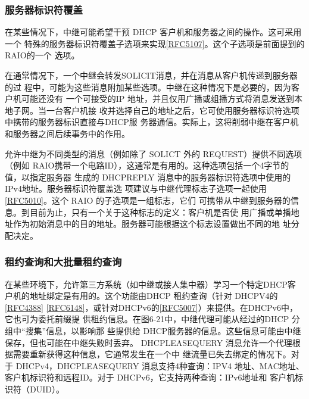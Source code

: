 \subsubsection{服务器标识符覆盖}
在某些情况下，中继可能希望干预 DHCP 客户机和服务器之间的操作。这可采用一个
特殊的服务器标识符覆盖子选项来实现\href{https://www.rfc-editor.org/rfc/rfc5107}{\href{https://www.rfc-editor.org/rfc/rfc5107}{[RFC5107]}}。这个子选项是前面提到的
RAIO的一个
选项。

在通常情况下，一个中继会转发SOLICIT消息，并在消息从客户机传递到服务器的过
程中，可能为这些消息附加某些选项。中继在这种情况下是必要的，因为客户机可能还没有
一个可接受的IP 地址，并且仅用广播或组播方式将消息发送到本地子网。当一台客户机接
收并选择自己的地址之后，它可使用服务器标识符选项中携带的服务器标识直接与DHCP服
务器通信。实际上，这将削弱中继在客户机和服务器之间后续事务中的作用。

允许中继为不同类型的消息（例如除了 SOLICT 外的 REQUEST）提供不同选项（例如
RAIO携带一个电路ID），这通常是有用的。这种选项包括一个4字节的值，以指定服务器
生成的 DHCPREPLY 消息中的服务器标识符选项中使用的IPv4地址。服务器标识符覆盖选
项建议与中继代理标志子选项一起使用\href{https://www.rfc-editor.org/rfc/rfc5010}{\href{https://www.rfc-editor.org/rfc/rfc5010}{[RFC5010]}}。这个
RAIO 的子选项是一组标志，它们
可携带从中继到服务器的信息。到目前为止，只有一个关于这种标志的定义：客户机是否使
用广播或单播地址作为初始消息中的目的地址。服务器可能根据这个标志设置做出不同的地
址分配决定。

\subsubsection{租约查询和大批量租约查询}
在某些环境下，允许第三方系统（如中继或接人集中器）学习一个特定DHCP客
户机的地址绑定是有用的。这个功能由DHCP 租约查询（针对
DHCPV4的\href{https://www.rfc-editor.org/rfc/rfc4388}{\href{https://www.rfc-editor.org/rfc/rfc4388}{[RFC4388]}}
\href{https://www.rfc-editor.org/rfc/rfc6148}{\href{https://www.rfc-editor.org/rfc/rfc6148}{[RFC6148]}}，或针对DHCPv6的\href{https://www.rfc-editor.org/rfc/rfc5007}{\href{https://www.rfc-editor.org/rfc/rfc5007}{[RFC5007]}}）来提供。在DHCPv6中，它也可为委托前缀提
供租约信息。在图6-21中，中继代理可能从经过的DHCP 分组中“搜集”信息，以影响那
些提供给 DHCP服务器的信息。这些信息可能由中继保存，但也可能在中继失败时丢弃。
DHCPLEASEQUERY 消息允许一个代理根据需要重新获得这种信息，它通常发生在一个中
继流量已失去绑定的情况下。对于 DHCPv4，DHCPLEASEQUERY 消息支持4种查询：IPV4
地址、MAC地址、客户机标识符和远程ID。对于 DHCPv6，它支持两种查询：IPv6地址和
客户机标识符（DUID）。

